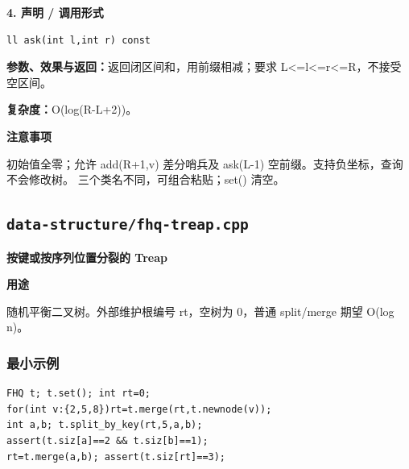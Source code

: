 \documentclass[UTF8,a4paper,10pt]{ctexart}
\newcommand{\TemplUsage}[1]{\textbf{用途}\par #1\par}
\newcommand{\TemplNote}[1]{\textbf{注意事项}\par #1\par}
\begin{document}
\noindent\begin{minipage}{\textwidth}
\textbf{4. 声明 / 调用形式}
\begin{lstlisting}
ll ask(int l,int r) const
\end{lstlisting}
\textbf{参数、效果与返回：}返回闭区间和，用前缀相减；要求 L<=l<=r<=R，不接受空区间。

\textbf{复杂度：}O(log(R-L+2))。

\TemplNote{初始值全零；允许 add(R+1,v) 差分哨兵及 ask(L-1) 空前缀。支持负坐标，查询不会修改树。 三个类名不同，可组合粘贴；set() 清空。}
\end{minipage}\par\vspace{0.4em}
\clearpage
\subsection{\texttt{data-structure/fhq-treap.cpp}}
\textbf{按键或按序列位置分裂的 Treap}\par
\TemplUsage{随机平衡二叉树。外部维护根编号 rt，空树为 0，普通 split/merge 期望 O(log n)。}
\subsubsection*{最小示例}
\begin{lstlisting}
FHQ t; t.set(); int rt=0;
for(int v:{2,5,8})rt=t.merge(rt,t.newnode(v));
int a,b; t.split_by_key(rt,5,a,b);
assert(t.siz[a]==2 && t.siz[b]==1);
rt=t.merge(a,b); assert(t.siz[rt]==3);
\end{lstlisting}
\end{document}
